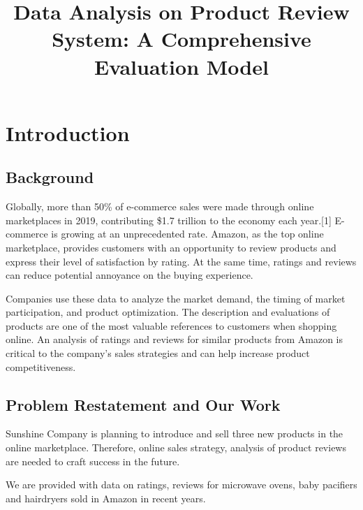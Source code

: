 \documentclass[12pt]{article}  %
\title{ Data Analysis on Product Review System: A Comprehensive Evaluation Model}  %
\begin{document}

\maketitle  %
\tableofcontents  %


\section{Introduction}
\subsection{Background}
Globally, more than 50\% of e-commerce sales were made through online marketplaces in 2019, contributing \$1.7 trillion to the economy each year.[1] E-commerce is growing at an unprecedented rate. Amazon, as the top online marketplace, provides customers with an opportunity to review products and express their level of satisfaction by rating. At the same time, ratings and reviews can reduce potential annoyance on the buying experience. 


Companies use these data to analyze the market demand, the timing of market participation, and product optimization. The description and evaluations of products are one of the most valuable references to customers when shopping online. An analysis of ratings and reviews for similar products from Amazon is critical to the company's sales strategies and can help increase product competitiveness. 


\subsection{Problem Restatement and Our Work}
Sunshine Company is planning to introduce and sell three new products in the online marketplace. Therefore, online sales strategy, analysis of product reviews are needed to craft success in the future.

We are provided with data on ratings, reviews for microwave ovens, baby pacifiers and hairdryers sold in Amazon in recent years. 
\end{document}

